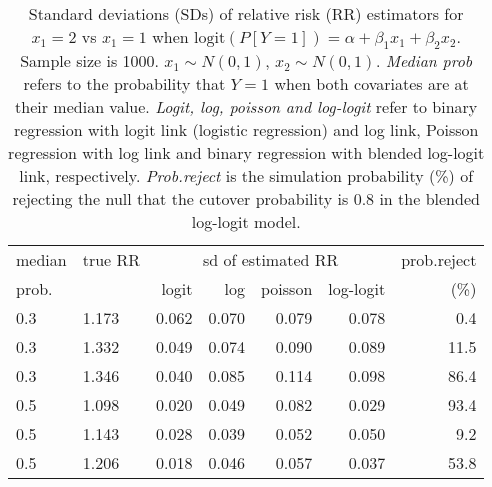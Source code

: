 \documentclass[12pt,a4paper]{article}
\begin{document}
\begin{table}[H] 
\small\sf\centering 
\caption{Standard deviations (SDs) of relative risk (RR) estimators for $x_1=2$ vs $x_1=1$ when $\mbox{logit}(P[Y=1])=\alpha+\beta_1 x_1 + \beta_2 x_2$. Sample size is 1000. $x_1 \sim $$N(0,1)$, $x_2 \sim N(0,1)$. {\it Median prob} refers to the probability that $Y=1$ when both covariates are at their median value. {\it Logit, log, poisson and log-logit} refer to binary regression with logit link (logistic regression) and log link, Poisson regression with log link and binary regression with blended log-logit link, respectively. {\it Prob.reject} is the simulation probability (\%) of rejecting the null that the cutover probability is $0.8$ in the blended log-logit model.} 
\begin{tabular}{llrrrrr} 
\toprule 
median & true RR & \multicolumn{4}{c}{sd of estimated RR} & prob.reject \\ 
prob. & & logit & log & poisson & log-logit  & (\%) \\ \midrule 
0.3 & 1.173 & 0.062 & 0.070 & 0.079 & 0.078 &  0.4 \\  
0.3 & 1.332 & 0.049 & 0.074 & 0.090 & 0.089 & 11.5 \\  
0.3 & 1.346 & 0.040 & 0.085 & 0.114 & 0.098 & 86.4 \\  
0.5 & 1.098 & 0.020 & 0.049 & 0.082 & 0.029 & 93.4 \\  
0.5 & 1.143 & 0.028 & 0.039 & 0.052 & 0.050 &  9.2 \\  
0.5 & 1.206 & 0.018 & 0.046 & 0.057 & 0.037 & 53.8 \\  
\bottomrule 
\end{tabular} 
\end{table} 
\end{document}
